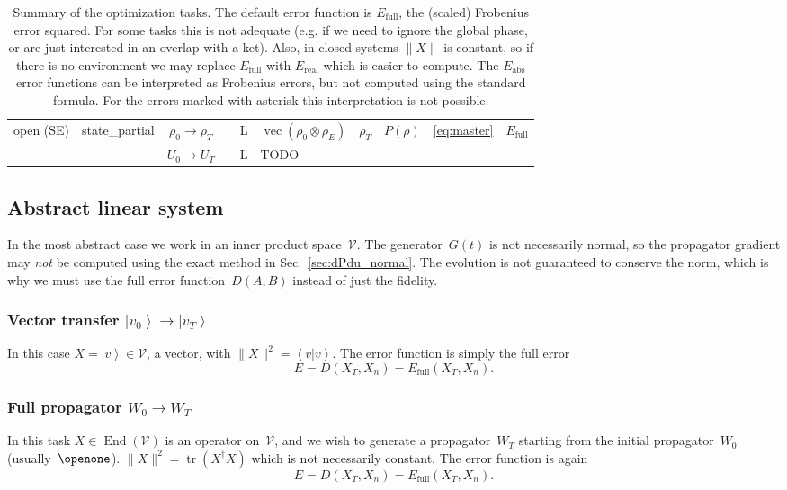 \documentclass[aps, pra, a4paper, longbibliography, superscriptaddress]{revtex4-1}
\newcommand{\I}{\openone}
\newcommand{\be}{\begin{equation}}
\newcommand{\ee}{\end{equation}}
\newcommand{\ket}[1]{\left| #1 \right \rangle}
\newcommand{\braket}[2]{\left \langle #1 | #2 \right \rangle}
\newcommand{\hilb}[1]{\mathcal{#1}}
\DeclareMathOperator{\End}{End} %
\DeclareMathOperator{\tr}{tr}
\DeclareMathOperator{\cvec}{vec}
\newcommand{\Xt}{X_T}  %
\newcommand{\Xn}{X_n}  %
\begin{document}
\begin{table}
\begin{tabular}{ll|c|c|c|l|l|l|l|l}
\hline
open (SE)
& state\_partial & $\rho_0 \to \rho_T$ && L
& $\cvec(\rho_0 \otimes \rho_E)$ & $\rho_T$ & $P(\rho)$ &
\eqref{eq:master} & $E_\text{full}$\\
& & $U_0 \to U_T$ && L & TODO
\end{tabular}
\caption{Summary of the optimization tasks.
The default error function is $E_\text{full}$, the (scaled) Frobenius error squared.
For some tasks this is not adequate (e.g. if we need to ignore the global phase, or are just interested in an overlap with a ket).
Also, in closed systems $\|X\|$ is constant, so if there is no environment we may replace $E_\text{full}$ with $E_\text{real}$
which is easier to compute.
The $E_\text{abs}$ error functions can be interpreted as Frobenius errors, but not computed using the standard formula.
For the errors marked with asterisk this interpretation is not possible.
\label{table:tasks}
}
\end{table}


\subsection{Abstract linear system}

In the most abstract case we work in an inner product space~$\hilb{V}$.
The generator~$G(t)$ is not necessarily normal, so
the propagator gradient may \emph{not} be computed using the exact
method in Sec.~\ref{sec:dPdu_normal}.
The evolution is not guaranteed to conserve the norm, which is why we must
use the full error function~$D(A,B)$ instead of just the fidelity.


\subsubsection{Vector transfer $\ket{v_0} \to \ket{v_T}$}

In this case $X = \ket{v} \in \hilb{V}$, a vector, with
$\|X\|^2 = \braket{v}{v}$.
The error function is simply the full error
\be
E = D(\Xt, \Xn) = E_\text{full}(\Xt, \Xn).
\ee

\subsubsection{Full propagator $W_0 \to W_T$}

In this task
$X \in \End(\hilb{V})$
is an operator on~$\hilb{V}$, and
we wish to generate a propagator~$W_T$
starting from the initial propagator~$W_0$ (usually~$\I$).
$\|X\|^2 = \tr(X^\dagger X)$ which is not necessarily constant.
The error function is again
\be
E = D(\Xt, \Xn) = E_\text{full}(\Xt, \Xn).
\ee
\end{document}
